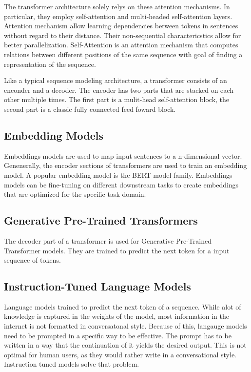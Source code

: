 \documentclass[english, version-2022-01]{uzl-thesis}
\begin{document}
The transformer architecture \cite{Vaswani2017} solely relys on these attention mechanisms.
In particular, they employ self-attention and multi-headed self-attention layers.
Attention mechanism allow learning dependencies between tokens in sentences without regard to their distance.
Their non-sequential charactericstics allow for better parallelization.
Self-Attention is an attention mechanism that computes relations between different positions of the same sequence with goal of finding a representation of the sequence.

Like a typical sequence modeling architecture, a transformer consists of an enconder and a decoder. The encoder has two parts that are stacked on each other multiple times.
The first part is a mulit-head self-attention block, the second part is a classic fully connected feed foward block.

\subsection{Embedding Models}

Embeddings models are used to map input sentences to a n-dimensional vector.
Genenerally, the encoder sections of transformers are used to train an embedding model. 
A popular embedding model is the BERT model family. 
Embeddings models can be fine-tuning on different downstream tasks to create embeddings that are optimized for the specific task domain.

\subsection{Generative Pre-Trained Transformers}

The decoder part of a transformer is used for Generative Pre-Trained Transformer models.
They are trained to predict the next token for a input sequence of tokens.


 \subsection{Instruction-Tuned Language Models}

Language models trained to predict the next token of a sequence.
While alot of knowledge is captured in the weights of the model, most information in the internet is not formatted in conversatonal style.
Because of this, langauge models need to be prompted in a specific way to be effective. The prompt has to be written in a way that the continuation of it yields the desired output.
This is not optimal for human users, as they would rather write in a conversational style. Instruction tuned models solve that problem.
\end{document}

